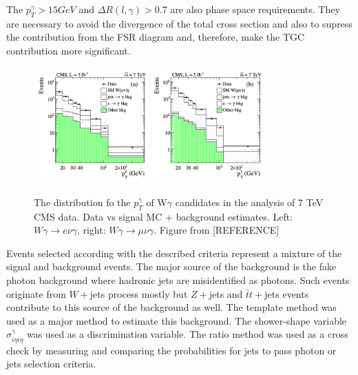 The $p_T^\gamma>15 GeV$ and  $\Delta R(l,\gamma)>$0.7 are also phase space requirements. They are necessary to avoid the divergence of the total cross section and also to supress the contribution from the FSR diagram and, therefore, make the TGC contribution more significant.\\





 \begin{figure}[htb]
  \begin{center}
    {\includegraphics[width=0.80\textwidth]{../figs/WgAbout/Wg7TeV_CMS_ptGamma.png}}
    \caption{The distribution fo the $p_T^\gamma$ of W$\gamma$ candidates in the analysis of 7 TeV CMS data. Data vs signal MC + background estimates. Left: $W\gamma\rightarrow e\nu\gamma$, right: $W\gamma\rightarrow \mu\nu\gamma$. Figure from [REFERENCE]}
    \label{fig:Wg7TeV_CMS_ptGamma}
  \end{center}
\end{figure}



Events selected according with the described criteria represent a mixture of the signal and background events. The major source of the background is the fake photon background where hadronic jets are misidentified as photons. Such events originate from $W+$jets process mostly but $Z+$jets and $\bar{t}t+$jets events contribute to this source of the background as well. The template method was used as a major method to estimate this background. The shower-shape variable $\sigma_{i\eta i\eta}^{\gamma}$ was used as a discrimination variable. The ratio method was used as a cross check by measuring and comparing the probabilities for jets to pass photon or jets selection criteria. \\

